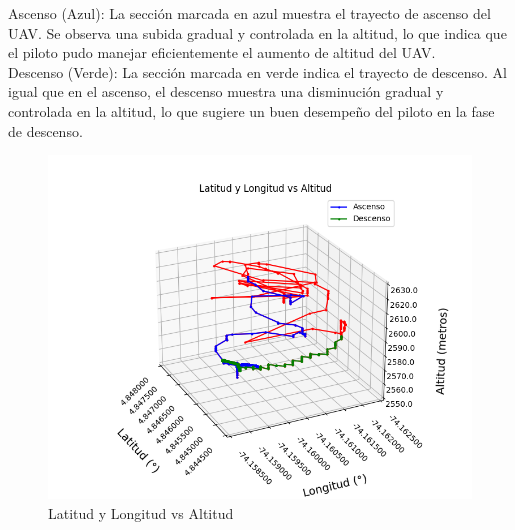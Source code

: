         Ascenso (Azul): La sección marcada en azul muestra el trayecto de ascenso del UAV. Se observa una subida gradual y controlada en la altitud, lo que indica que el piloto pudo manejar eficientemente el aumento de altitud del UAV.\\
        Descenso (Verde): La sección marcada en verde indica el trayecto de descenso. Al igual que en el ascenso, el descenso muestra una disminución gradual y controlada en la altitud, lo que sugiere un buen desempeño del piloto en la fase de descenso.


        \begin{figure}[H]
            \centering
            \includegraphics[width=\textwidth]{Imagenes/Vuelo/latitud y longitud acenso.png}
            \caption{Latitud y Longitud vs Altitud}
            \label{fig:GPS_altitud}
        \end{figure}


